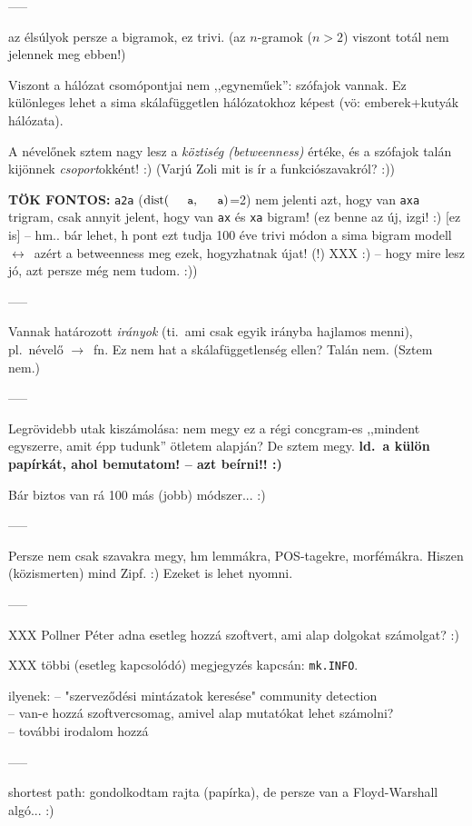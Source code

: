 \documentclass{llncs}
\newcommand{\nyil}{$\rightarrow$\ }
\newcommand{\nnyil}{$\leftrightarrow$\ }
\newcommand{\code}[1]{\texttt{\small #1}}
\newcommand{\embf}[1]{\textbf{#1}}
\newcommand{\path}[1]{\code{#1}}
\DeclareMathOperator{\distop}{dist}
\newcommand{\dist}[2]{\ensuremath{\distop(\path{#1},\path{#2})}}
\newcommand{\smp}[1]{{\small (#1)}}
\begin{document}
-----

az élsúlyok persze a bigramok, ez trivi.
\smp{az $n$-gramok ($n > 2$) viszont totál nem jelennek meg ebben!}

Viszont a hálózat csomópontjai nem ,,egyneműek'': szófajok vannak.
Ez különleges lehet a sima skálafüggetlen hálózatokhoz képest
(vö: emberek+kutyák hálózata).

A névelőnek sztem nagy lesz a \emph{köztiség (betweenness)} értéke,
és a szófajok talán kijönnek \emph{csoport}okként! :)
\smp{Varjú Zoli mit is ír a funkciószavakról? :)}

\embf{TÖK FONTOS:}
\path{a2a} (\dist{a}{a}=2) nem jelenti azt, hogy van \path{axa} trigram,
csak annyit jelent, hogy van \path{ax} és \path{xa} bigram!
\smp{ez benne az új, izgi! :) [ez is]
-- hm.. bár lehet, h pont ezt tudja
   100 éve trivi módon a sima bigram modell
   \nnyil azért a betweenness meg ezek, hogyzhatnak újat! (!) XXX :)
-- hogy mire lesz jó, azt persze még nem tudom. :)}

-----

Vannak határozott \emph{irányok}
(ti.\ ami csak egyik irányba hajlamos menni), pl.\ névelő \nyil fn.  
Ez nem hat a skálafüggetlenség ellen? Talán nem. (Sztem nem.)

-----

Legrövidebb utak kiszámolása:
nem megy ez a régi concgram-es ,,mindent egyszerre, amit épp tudunk''
ötletem alapján? De sztem megy.
\embf{ld.\ a külön papírkát, ahol bemutatom! -- azt beírni!! :)}

Bár biztos van rá 100 más (jobb) módszer... :)

-----

Persze nem csak szavakra megy, hm lemmákra, POS-tagekre, morfémákra.
Hiszen (közismerten) mind Zipf. :) Ezeket is lehet nyomni.

-----

XXX Pollner Péter adna esetleg hozzá szoftvert,
ami alap dolgokat számolgat? :)

XXX többi (esetleg kapcsolódó) megjegyzés 
\cite{kovacs2012magyar} kapcsán: {\tt mk.INFO}.

ilyenek:
-- "szerveződési mintázatok keresése" community detection\\
-- van-e hozzá szoftvercsomag, amivel alap mutatókat lehet számolni?\\
-- további irodalom hozzá

-----

shortest path: gondolkodtam rajta (papírka),
de persze van a Floyd-Warshall algó... :)
\end{document}
